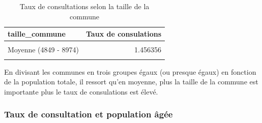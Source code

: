 \documentclass[
]{article}
\begin{document}
\begin{table}[H]
\centering
\caption{\label{tab:unnamed-chunk-8}Taux de consultations selon la taille de la commune}
\centering
\begin{tabular}[t]{lr}
\toprule
taille\_commune & Taux de consulations\\
\midrule
\cellcolor{gray!10}{Grande (> 8974)} & \cellcolor{gray!10}{1.526810}\\
Moyenne (4849 - 8974) & 1.456356\\
\cellcolor{gray!10}{Petite (<= 4848)} & \cellcolor{gray!10}{1.383861}\\
\bottomrule
\end{tabular}
\end{table}

En divisant les communes en trois groupes égaux (ou presque égaux) en
fonction de la population totale, il ressort qu'en moyenne, plus la
taille de la commune est importante plus le taux de consulations est
élevé.

\subsubsection{Taux de consultation et population
âgée}\label{taux-de-consultation-et-population-uxe2guxe9e}
\end{document}
